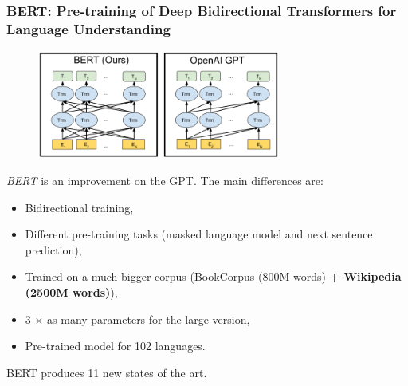 \documentclass[9pt]{beamer}
\begin{document}
\begin{frame}
  \frametitle{BERT: Pre-training of Deep Bidirectional Transformers
    for Language Understanding}

  \begin{figure}
    \includegraphics[width = 8cm]{images/bert.png}
  \end{figure}

  \emph{BERT} is an improvement on the GPT. The main differences are:
  \begin{itemize}
  \item Bidirectional training,
  \item Different pre-training tasks (masked language model and next
    sentence prediction),
  \item Trained on a much bigger corpus (BookCorpus (800M words) \textbf{+
    Wikipedia (2500M words)}),
  \item 3 $\times$ as many parameters for the large version,
  \item Pre-trained model for 102 languages.
  \end{itemize}

  BERT produces 11 new states of the art.
\end{frame}
\end{document}

